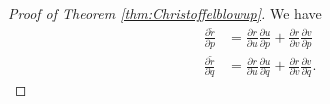 \documentclass{article}
\newcommand{\loc}{\mathrm{loc}}
\newcommand{\Mw}{M_{\mathrm{wns}}}
\begin{document}
\begin{proof}[Proof of Theorem \ref{thm:Christoffelblowup}]

We have
\begin{equation} \label{EqDr}
   \begin{aligned}
      \frac{\partial \tilde{r}}{\partial p}&=\frac{\partial r}{\partial u}\frac{\partial u}{\partial p}+\frac{\partial r}{\partial v}\frac{\partial v}{\partial p}\\
     \frac{\partial \tilde{r}}{\partial q}&=\frac{\partial r}{\partial u}\frac{\partial u}{\partial q}+\frac{\partial r}{\partial v}\frac{\partial v}{\partial q}.
\end{aligned}
\end{equation}


\end{proof}
\end{document}
